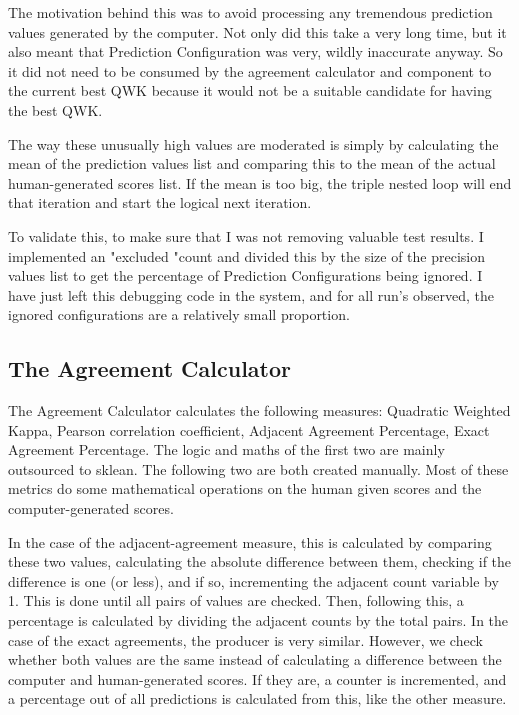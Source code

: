 The motivation behind this was to avoid processing any tremendous prediction values generated by the computer. Not only did this take a very long time, but it also meant that Prediction Configuration was very, wildly inaccurate anyway. So it did not need to be consumed by the agreement calculator and component to the current best QWK because it would not be a suitable candidate for having the best QWK. 

The way these unusually high values are moderated is simply by calculating the mean of the prediction values list and comparing this to the mean of the actual human-generated scores list. If the mean is too big, the triple nested loop will end that iteration and start the logical next iteration.

To validate this, to make sure that I was not removing valuable test results. I implemented an "excluded "count and divided this by the size of the precision values list to get the percentage of Prediction Configurations being ignored. I have just left this debugging code in the system, and for all run's observed, the ignored configurations are a relatively small proportion.

\subsection{The Agreement Calculator}

The Agreement Calculator calculates the following measures: Quadratic Weighted Kappa, Pearson correlation coefficient, Adjacent Agreement Percentage, Exact Agreement Percentage. The logic and maths of the first two are mainly outsourced to sklean. The following two are both created manually. Most of these metrics do some mathematical operations on the human given scores and the computer-generated scores. 


In the case of the adjacent-agreement measure, this is calculated by comparing these two values, calculating the absolute difference between them, checking if the difference is one (or less), and if so, incrementing the adjacent count variable by 1. This is done until all pairs of values are checked. Then, following this, a percentage is calculated by dividing the adjacent counts by the total pairs. In the case of the exact agreements, the producer is very similar. However, we check whether both values are the same instead of calculating a difference between the computer and human-generated scores. If they are, a counter is incremented, and a percentage out of all predictions is calculated from this, like the other measure.
